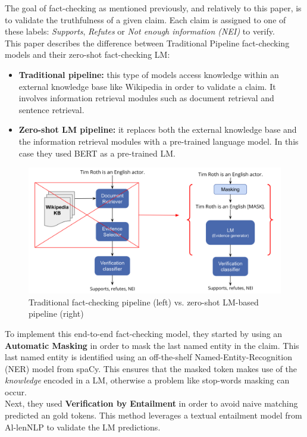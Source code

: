 \documentclass[10pt, english]{report}
\begin{document}
The goal of fact-checking as mentioned previously, and relatively to this paper, is to validate the truthfulness of a given claim. Each claim is assigned to one of these labels: \textit{Supports}, \textit{Refutes} or \textit{Not enough information (NEI)} to verify.\\

This paper describes the difference between Traditional Pipeline fact-checking models and their zero-shot fact-checking LM:

\begin{itemize}
\item \textbf{Traditional pipeline:} this type of models access knowledge within an external knowledge base like Wikipedia in order to validate a claim. It involves information retrieval modules such as document retrieval and sentence retrieval.
\item \textbf{Zero-shot LM pipeline:} it replaces both the external knowledge base and the information retrieval modules with a pre-trained language model. In this case they used BERT as a pre-trained LM.
\end{itemize}

\begin{figure}[H]
	\centering
	\includegraphics[scale=0.35]{img/tradition_and_zero_shot_lm.png}
	\caption{Traditional fact-checking pipeline (left) vs. zero-shot LM-based pipeline (right) \cite{lee2020language}}
\end{figure}

To implement this end-to-end fact-checking model, they started by using an \textbf{Automatic Masking} in order to mask the last named entity in the claim. This last named entity is identified using an off-the-shelf Named-Entity-Recognition (NER) model from spaCy. This ensures that the masked token makes use of the \textit{knowledge} encoded in a LM, otherwise a problem like stop-words masking can occur.\\
Next, they used \textbf{Verification by Entailment} in order to avoid naive matching predicted an gold tokens. This method leverages a textual entailment model from Al-lenNLP to validate the LM predictions.\\
\end{document}
